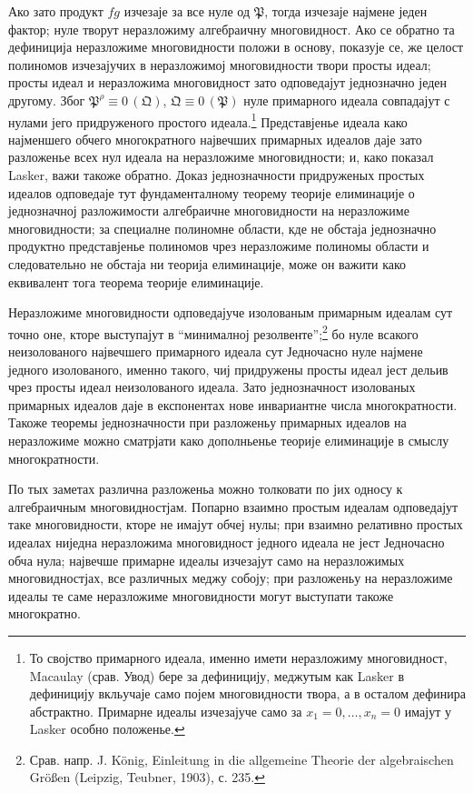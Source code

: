 ﻿\documentclass[11pt]{article}
\newcommand{\ideal}[1]{\mathfrak{#1}}
\newcommand{\eqzero}[1]{\equiv 0\,(#1)}
\begin{document}
Ако зато продукт \(fg\) изчезаје за все нуле од \(\ideal P\), тогда изчезаје најмене једен фактор; нуле творут неразложиму алгебраичну многовидност. Ако се обратно та дефиниција неразложиме многовидности положи в основу, показује се, же целост полиномов изчезајучих в неразложимој многовидности твори просты идеал; просты идеал и неразложима многовидност зато одповедајут једнозначно једен другому. Због \(\ideal P^\rho\eqzero{\ideal Q}\), \(\ideal Q\eqzero{\ideal P}\) нуле примарного идеала совпадајут с нулами јего придруженого простого идеала.\footnote{То својство примарного идеала, именно имети неразложиму многовидност, Macaulay (срав. Увод) бере за дефиницију, меджутым как Lasker в дефиницију вкльучаје само појем многовидности твора, а в осталом дефинира абстрактно. Примарне идеалы изчезајуче само за \(x_1=0,
\ldots,x_n=0\) имајут у Lasker особно положенье.} Представјенье идеала како најменшего обчего многократного највечших примарных идеалов даје зато разложенье всех нул идеала на неразложиме многовидности; и, како показал Lasker, важи такоже обратно. Доказ једнозначности придруженых простых идеалов одповедаје тут фундаменталному теорему теорије елиминације о једнозначној разложимости алгебраичне многовидности на неразложиме многовидности; за специалне полиномне области, кде не обстаја једнозначно продуктно представјенье полиномов чрез неразложиме полиномы области и следовательно не обстаја ни теорија елиминације, може он важити како еквивалент тога теорема теорије елиминације.

Неразложиме многовидности одповедајуче изолованым примарным идеалам сут точно оне, кторе выступајут в ``минималној резолвенте'';\footnote{Срав. напр. J. König, Einleitung in die allgemeine Theorie der algebraischen Größen (Leipzig, Teubner, 1903), с. 235.} бо нуле всакого неизолованого највечшего примарного идеала сут Једночасно нуле најмене једного изолованого, именно такого, чиј придружены просты идеал јест дельив чрез просты идеал неизолованого идеала. Зато једнозначност изолованых примарных идеалов даје в експонентах нове инвариантне числа многократности. Такоже теоремы једнозначности при разложеньу примарных идеалов на неразложиме можно сматрјати како дополньенье теорије елиминације в смыслу многократности.

По тых заметах различна разложеньа можно толковати по јих односу к алгебраичным многовидностјам. Попарно взаимно простым идеалам одповедајут таке многовидности, кторе не имајут обчеј нулы; при взаимно релативно простых идеалах ниједна неразложима многовидност једного идеала не јест Једночасно обча нула; највечше примарне идеалы изчезајут само на неразложимых многовидностјах, все различных меджу собоју; при разложеньу на неразложиме идеалы те саме неразложиме многовидности могут выступати такоже многократно.
\end{document}
